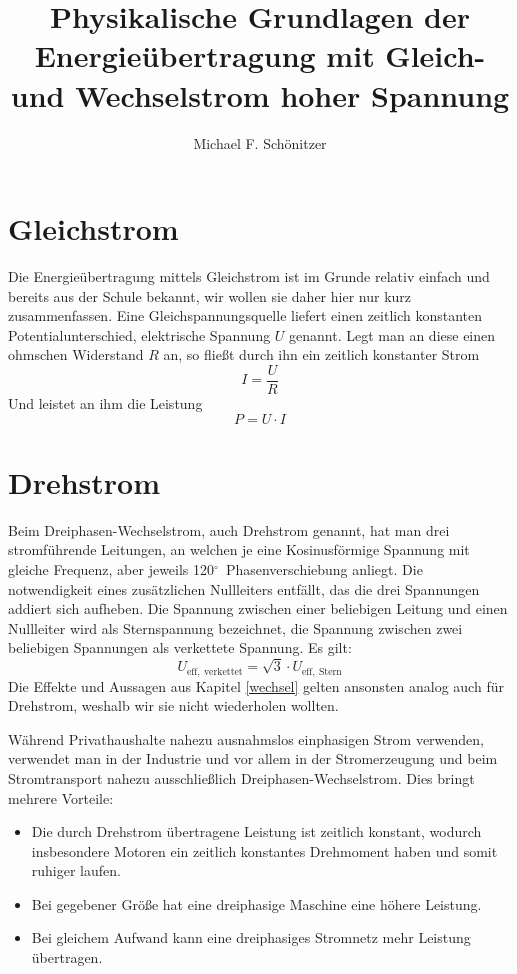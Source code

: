 \documentclass[10pt,a4paper]{article}
\author{Michael F. Schönitzer}
\title{Physikalische Grundlagen der Energieübertragung mit Gleich- und Wechselstrom hoher Spannung }
\newcommand{\degree}{$^\circ$}
\begin{document}
\maketitle

\section{Gleichstrom}
Die Energieübertragung mittels Gleichstrom ist im Grunde relativ einfach und bereits aus der Schule bekannt, wir wollen sie daher hier nur kurz zusammenfassen.
Eine Gleichspannungsquelle liefert einen zeitlich konstanten Potentialunterschied, elektrische Spannung $U$ genannt. Legt man an diese einen ohmschen Widerstand $R$ an, so fließt durch ihn ein zeitlich konstanter Strom
\begin{equation}
I = \frac{U}{R}
\end{equation}
Und leistet an ihm die Leistung
\begin{equation}
P = U \cdot I
\end{equation}



\section{Drehstrom}
Beim Dreiphasen-Wechselstrom, auch Drehstrom genannt, hat man drei stromführende Leitungen, an welchen je eine Kosinusförmige Spannung mit gleiche Frequenz, aber jeweils 120\degree\  Phasenverschiebung anliegt.
Die notwendigkeit eines zusätzlichen Nullleiters entfällt, das die drei Spannungen addiert sich aufheben.
Die Spannung zwischen einer beliebigen Leitung und einen Nullleiter wird als Sternspannung bezeichnet,
die Spannung zwischen zwei beliebigen Spannungen als verkettete Spannung. Es gilt:
\begin{equation}
U_{\mathrm{eff},\:\mathrm{verkettet}} = \sqrt{3} \cdot U_{\mathrm{eff},\:\mathrm{Stern}}
\end{equation}
Die Effekte und Aussagen aus Kapitel \ref{wechsel} gelten ansonsten analog auch für Drehstrom, weshalb wir sie nicht wiederholen wollten.

Während Privathaushalte nahezu ausnahmslos einphasigen Strom verwenden, verwendet man in der Industrie und vor allem in der Stromerzeugung und beim Stromtransport nahezu ausschließlich Dreiphasen-Wechselstrom. Dies bringt mehrere Vorteile\cite{Harrison}:
\begin{itemize}
\item Die durch Drehstrom übertragene Leistung ist zeitlich konstant, wodurch insbesondere Motoren ein zeitlich konstantes Drehmoment haben und somit ruhiger laufen.
\item Bei gegebener Größe hat eine dreiphasige Maschine eine höhere Leistung.
\item Bei gleichem Aufwand kann eine dreiphasiges Stromnetz mehr Leistung übertragen.
\end{itemize}
\end{document}
